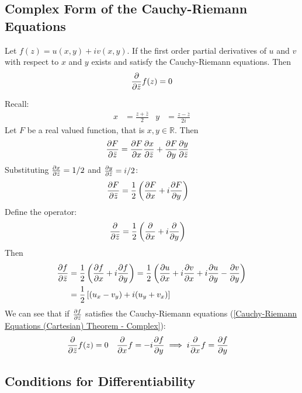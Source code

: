 \documentclass[12pt, english]{book}
\makeatletter
\renewenvironment{proof}[1][\proofname]{\par
	\pushQED{\qed}%
	\normalfont \topsep6\p@\@plus6\p@\relax
	\list{}{%
		\settowidth{\leftmargin}{\itshape\proofname:\hskip\labelsep}%
		\setlength{\labelwidth}{0pt}%
		\setlength{\itemindent}{-\leftmargin}%
	}%
	\item[\hskip\labelsep\itshape#1\@addpunct{:}]\ignorespaces
}{%
	\popQED\endlist\@endpefalse
}
\makeatother
\begin{document}
	\subsection{Complex Form of the Cauchy-Riemann Equations}
	\label{Cauchy-Riemann Equations (Complex) Subsection - Complex}
	
	\begin{theorem}
		\label{Cauchy-Riemann Equations (Complex) Theorem - Complex}
		Let \(f(z) = u(x,y) + iv(x,y)\). If the first order partial derivatives of \(u\) and \(v\) with respect to \(x\) and \(y\) exists and satisfy the Cauchy-Riemann equations. Then
		\[\pdv{\bar{z}} f(z) = 0\]
	\end{theorem}
	\begin{proof}{\color{Grey}
		Recall:
		\begin{align*}
			x &= \frac{z + \bar{z}}{2} & y &= \frac{z - \bar{z}}{2i}
		\end{align*}
		Let \(F\) be a real valued function, that is \(x, y \in \mathbb{R}\). Then
		\begin{align*}
			\pdv{F}{\bar{z}} &= \pdv{F}{x} \pdv{x}{\bar{z}} + \pdv{F}{y} \pdv{y}{\bar{z}}
		\end{align*}
		Substituting \(\pdv{x}{\bar{z}} = 1/2\) and \(\pdv{y}{\bar{z}} = i/2\):
		\begin{align*}
			\pdv{F}{\bar{z}} &= \frac{1}{2} \left(\pdv{F}{x} + i \pdv{F}{y} \right)
		\end{align*}
		Define the operator:
		\begin{align*}
			\pdv{\bar{z}} &= \frac{1}{2} \left(\pdv{x} + i \pdv{y} \right)
		\end{align*}
		Then 
		\begin{align*}
			\pdv{f}{\bar{z}} &= \frac{1}{2} \left(\pdv{f}{x} + i \pdv{f}{y} \right)
				= \frac{1}{2} \left(\pdv{u}{x} + i \pdv{v}{x} + i\pdv{u}{y} -  \pdv{v}{y}  \right) \\
				&= \frac{1}{2} \left[ (u_x - v_y) + i (u_y + v_x)\right]
		\end{align*}
		We can see that if \(\pdv{f}{\bar{z}}\) satisfies the Cauchy-Riemann equations (\cref{Cauchy-Riemann Equations (Cartesian) Theorem - Complex}):
		\begin{align*}
			\pdv{\bar{z}} f(z) &= 0 & \pdv{x}f &= -i \pdv{f}{y} \implies i\pdv{x}f = \pdv{f}{y} 
		\end{align*}
		}
	\end{proof}
	
	\subsection{Conditions for Differentiability}
	\label{Conditions for Differentiablity Subsection - Complex}
	
\end{document}

